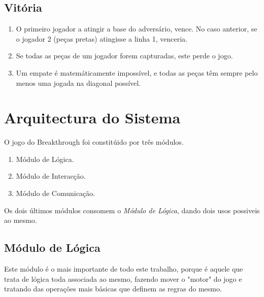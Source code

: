 \documentclass[15pt,a4paper]{article}
\begin{document}
\subsection{Vitória}
\begin{enumerate}
\item O primeiro jogador a atingir a base do adversário, vence. No caso anterior, se o jogador 2 (peças pretas) atingisse a linha 1, venceria.
\item Se todas as peças de um jogador forem capturadas, este perde o jogo.
\item Um empate é matemáticamente impossível, e todas as peças têm sempre pelo menos uma jogada na diagonal possível.
\end{enumerate}


\newpage

\section{Arquitectura do Sistema}

O jogo do Breakthrough foi constitúido por três módulos.

\begin{enumerate}
\item Módulo de Lógica.
\item Módulo de Interacção.
\item Módulo de Comunicação.
\end{enumerate}

Os dois últimos módulos consomem o \textit{Módulo de Lógica}, dando dois usos possiveis ao mesmo.




\subsection{Módulo de Lógica}

Este módulo é o mais importante de todo este trabalho, porque é aquele que trata de lógica toda associada ao mesmo, fazendo mover o "motor" do jogo e tratando das
operações mais básicas que definem as regras do mesmo.
\end{document}
